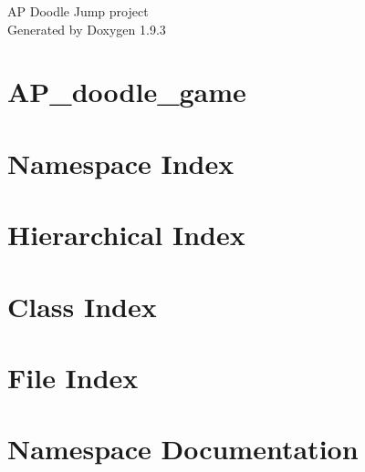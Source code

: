 \documentclass[twoside]{book}
\newcommand{\+}{\discretionary{\mbox{\scriptsize$\hookleftarrow$}}{}{}}
\newcommand{\clearemptydoublepage}{%
    \newpage{\pagestyle{empty}\cleardoublepage}%
  }
\begin{document}
  \raggedbottom
    \hypersetup{pageanchor=false,
                bookmarksnumbered=true,
                pdfencoding=unicode
               }
  \begin{titlepage}
  \vspace*{7cm}
  \begin{center}%
  {\Large AP Doodle Jump project}\\
  \vspace*{1cm}
  {\large Generated by Doxygen 1.9.3}\\
  \end{center}
  \end{titlepage}
  \clearemptydoublepage
  \tableofcontents
  \clearemptydoublepage
  \hypersetup{pageanchor=true}
\chapter{AP\+\_\+doodle\+\_\+game}
\label{md_README}

\chapter{Namespace Index}

\chapter{Hierarchical Index}

\chapter{Class Index}

\chapter{File Index}

\chapter{Namespace Documentation}


\end{document}
